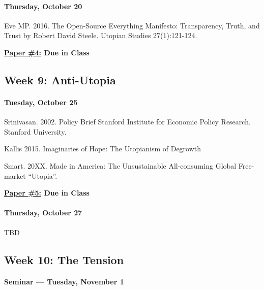       
\paragraph{Thursday, October 20}
      
      \begin{itemize*}
      \item Eve MP. 2016. The Open-Source Everything Manifesto: Transparency, Truth, and Trust by Robert David Steele. Utopian Studies 27(1):121-124.					
      \end{itemize*}
      
\textbf{\underline{Paper \#4:} Due in Class}

      \subsection{\textbf{Week 9:} Anti-Utopia}
      
\paragraph{Tuesday, October 25}
      
\begin{itemize*}
    \item Srinivasan. 2002. Policy Brief Stanford Institute for Economic Policy Research. Stanford University.
    \item Kallis 2015. Imaginaries of Hope: The Utopianism of Degrowth
    \item Smart. 20XX. Made in America: The Unsustainable All-consuming Global Free-market ``Utopia''.
\end{itemize*}

\textbf{\underline{Paper \#5:} Due in Class}
      
\paragraph{Thursday, October 27}
      
      \begin{itemize*}
      \item TBD
      \end{itemize*}
      
      \subsection{\textbf{Week 10:} The Tension}
      
      \paragraph{Seminar --- Tuesday, November 1}
      
